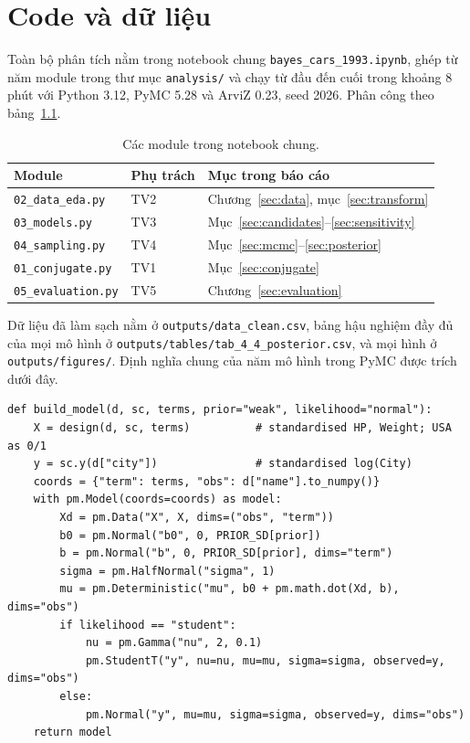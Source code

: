 \documentclass[12pt,a4paper]{report}
\begin{document}
\chapter{Code và dữ liệu}
\label{sec:appendix}

Toàn bộ phân tích nằm trong notebook chung \texttt{bayes\_cars\_1993.ipynb},
ghép từ năm module trong thư mục \texttt{analysis/} và chạy từ đầu đến cuối
trong khoảng 8 phút với Python 3.12, PyMC 5.28 và ArviZ 0.23, seed 2026. Phân
công theo bảng~\ref{tab:modules}.

\begin{table}[tp]
  \centering
  \caption{Các module trong notebook chung.}
  \label{tab:modules}
  \begin{tabular}{lll}
    \toprule
    Module & Phụ trách & Mục trong báo cáo \\
    \midrule
    \texttt{02\_data\_eda.py}   & TV2 & Chương~\ref{sec:data}, mục~\ref{sec:transform} \\
    \texttt{03\_models.py}      & TV3 & Mục~\ref{sec:candidates}--\ref{sec:sensitivity} \\
    \texttt{04\_sampling.py}    & TV4 & Mục~\ref{sec:mcmc}--\ref{sec:posterior} \\
    \texttt{01\_conjugate.py}   & TV1 & Mục~\ref{sec:conjugate} \\
    \texttt{05\_evaluation.py}  & TV5 & Chương~\ref{sec:evaluation} \\
    \bottomrule
  \end{tabular}
\end{table}

Dữ liệu đã làm sạch nằm ở \texttt{outputs/data\_clean.csv}, bảng hậu nghiệm đầy
đủ của mọi mô hình ở \texttt{outputs/tables/tab\_4\_4\_posterior.csv}, và mọi
hình ở \texttt{outputs/figures/}. Định nghĩa chung của năm mô hình trong PyMC
được trích dưới đây.

\begin{lstlisting}
def build_model(d, sc, terms, prior="weak", likelihood="normal"):
    X = design(d, sc, terms)          # standardised HP, Weight; USA as 0/1
    y = sc.y(d["city"])               # standardised log(City)
    coords = {"term": terms, "obs": d["name"].to_numpy()}
    with pm.Model(coords=coords) as model:
        Xd = pm.Data("X", X, dims=("obs", "term"))
        b0 = pm.Normal("b0", 0, PRIOR_SD[prior])
        b = pm.Normal("b", 0, PRIOR_SD[prior], dims="term")
        sigma = pm.HalfNormal("sigma", 1)
        mu = pm.Deterministic("mu", b0 + pm.math.dot(Xd, b), dims="obs")
        if likelihood == "student":
            nu = pm.Gamma("nu", 2, 0.1)
            pm.StudentT("y", nu=nu, mu=mu, sigma=sigma, observed=y, dims="obs")
        else:
            pm.Normal("y", mu=mu, sigma=sigma, observed=y, dims="obs")
    return model
\end{lstlisting}

\newpage

\printbibliography[heading=bibintoc,title={Tài liệu tham khảo}]
\end{document}
